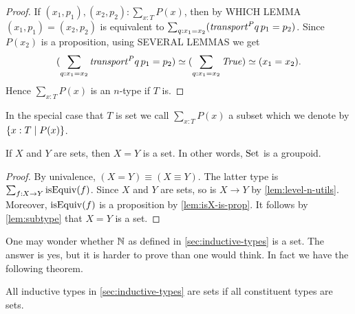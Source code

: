 \begin{proof}
If $(x_1,p_1),(x_2,p_2) : \sum_{x:T} P(x)$, then by WHICH LEMMA
$(x_1,p_1)=(x_2,p_2)$ is equivalent to 
$\sum_{q:x_1=x_2} ({\mathord{\mathit{transport}}}^P q\,p_1 = p_2)$. 
Since $P(x_2)$ is a proposition, using SEVERAL LEMMAS we get 
\[
(\sum_{q:x_1=x_2} {\mathord{\mathit{transport}}}^P q\,p_1 = p_2) \simeq 
(\sum_{q:x_1=x_2} \mathop{\mathit{True}}) \simeq (x_1=x_2).
\]
Hence $\sum_{x:T} P(x)$ is an $n$-type if $T$ is.
\end{proof}
In the special case that $T$ is set we call 
$\sum_{x:T} P(x)$ a subset which we denote by 
$\{x:T \mid P(x)\}$.

\begin{lemma}\label{lem:eq_of_sets-is-set}
If $X$ and $Y$ are sets, then $X=Y$ is a set. 
In other words, $\mathord{\mathrm{Set}}$ is a groupoid.
\end{lemma}

\begin{proof}
By univalence, $(X=Y) \equiv (X\equiv Y)$. The latter type is
$\sum_{f:X\to Y} \mathrm{isEquiv}(f)$. Since $X$ and $Y$ are sets,
so is $X\to Y$ by \cref{lem:level-n-utils}. Moreover,
$\mathrm{isEquiv}(f)$ is a proposition by \cref{lem:isX-is-prop}.
It follows by \cref{lem:subtype} that $X=Y$ is a set.  
\end{proof}

One may wonder whether $\mathbb{N}$ as defined in \cref{sec:inductive-types}
is a set. The answer is yes, but it is harder to prove than one
would think. In fact we have the following theorem.

\begin{theorem}\label{thm:isset-inductive-types}
All inductive types in \cref{sec:inductive-types} are sets
if all constituent types are sets.
\end{theorem}

